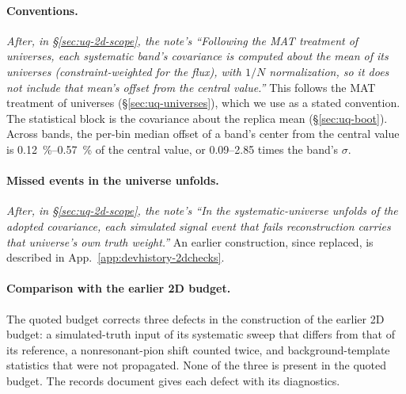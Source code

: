 \paragraph{Conventions.}
\emph{After, in \S\ref{sec:uq-2d-scope}, the note's ``Following the MAT treatment of universes, each systematic band's covariance is computed about the mean of its universes (constraint-weighted for the flux), with $1/N$ normalization, so it does not include that mean's offset from the central value.''}
This follows the MAT treatment of universes (\S\ref{sec:uq-universes}), which we use as a stated convention. The statistical block is the covariance about the replica mean (\S\ref{sec:uq-boot}). Across bands, the per-bin median offset of a band's center from the central value is \SIrange{0.12}{0.57}{\percent} of the central value, or 0.09--2.85 times the band's $\sigma$. %

\paragraph{Missed events in the universe unfolds.}
\emph{After, in \S\ref{sec:uq-2d-scope}, the note's ``In the systematic-universe unfolds of the adopted covariance, each simulated signal event that fails reconstruction carries that universe's own truth weight.''}
An earlier construction, since replaced, is described in App.~\ref{app:devhistory-2dchecks}. %

\paragraph{Comparison with the earlier 2D budget.}
The quoted budget corrects three defects in the construction of the earlier 2D budget: a simulated-truth input of its systematic sweep that differs from that of its reference, a nonresonant-pion shift counted twice, and background-template statistics that were not propagated. None of the three is present in the quoted budget. The records document gives each defect with its diagnostics.


